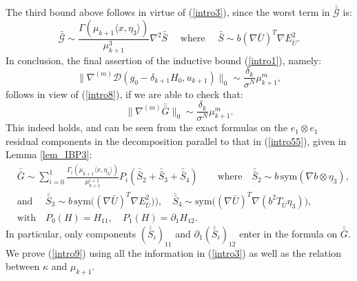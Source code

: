 \documentclass[reqno,twoside,11pt]{amsart}
\newcommand{\sym}{\mathrm{sym}}
\newcommand*{\dbar}[1]{\bar{\bar{#1}}}
\numberwithin{equation}{section}
\theoremstyle{plain}
\theoremstyle{definition}
\begin{document}
The third bound above follows in virtue of (\ref{intro3}), since the worst term in
$\dbar{\mathcal{G}}$ is:
$$\dbar{\mathcal{G}} \sim \frac{\Gamma(\mu_{k+1}\langle x,
  \eta_3\rangle)}{\mu_{k+1}^3}\nabla^2\dbar S
\quad \mbox{ where } \quad \dbar S \sim  b
(\nabla\bar U)^T\nabla E^2_{\bar U}. $$
In conclusion, the final assertion of the inductive bound (\ref{intro1}), namely:
$$\|\nabla^{(m)}\mathcal{D}(g_0-\delta_{k+1}H_0, u_{k+1})\|_0
\sim \frac{\delta_k}{\sigma^{N}}\mu_{k+1}^m,$$
follows in view of (\ref{intro8}), if we are able to check that: 
\begin{equation}\label{intro9}
\|\nabla^{(m)}\dbar G\|_0\sim
  \frac{\delta_k}{\sigma^{N}}\mu_{k+1}^m.
\end{equation} 
This indeed holds, and can be seen from the exact formulas on the $e_1\otimes
  e_1$ residual components in the decomposition parallel to that in
  (\ref{intro55}), given in Lemma \ref{lem_IBP3}:
\begin{equation*}
\begin{split}
& \dbar G \sim 
\sum_{i=0}^1 \frac{\Gamma_{i}(\mu_{k+1} \langle x, \eta_3\rangle
  )}{\mu_{k+1}^{i+1}} P_i(\dbar S_2 + \dbar S_3 + \dbar S_4)
\qquad \mbox{where} \quad \dbar S_2\sim b\,\sym(\nabla b\otimes \eta_3), 
\\ & \mbox{and } \quad
\dbar S_3\sim b\,\sym\big((\nabla \bar U)^T\nabla E^2_{\bar  U})\big),
\quad\dbar S_4 \sim \sym\big((\nabla\bar U)^T\nabla (b^2T_{\bar U}\eta_3)\big),\\
& \mbox{with} \quad P_0(H)=H_{11},\quad P_1(H)= \partial_1H_{12}.
\end{split}
\end{equation*}
In particular, only components $(\dbar{S}_i)_{11}$ and
$\partial_1(\dbar{S}_i)_{12}$ enter in the formula on $\dbar G$.
We prove (\ref{intro9}) using all the information in (\ref{intro3}) as
well as the relation between $\kappa$ and $\mu_{k+1}$.

\medskip
\end{document}
